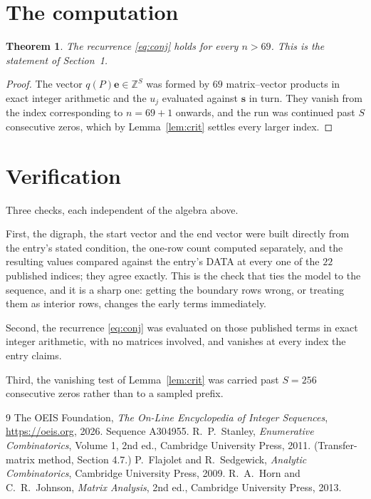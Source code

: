 \documentclass[11pt,a4paper]{article}
\theoremstyle{plain}
\newtheorem{theorem}{Theorem}
\theoremstyle{definition}
\begin{document}
\section{The computation}

\begin{theorem}
The recurrence \eqref{eq:conj} holds for every $n>69$. This is the statement of
Section~1.
\end{theorem}

\begin{proof}
The vector $q(P)\mathbf{e}\in\mathbb{Z}^{S}$ was formed by $69$ matrix--vector
products in exact integer arithmetic and the $u_j$ evaluated against $\mathbf{s}$ in turn.
They vanish from the index corresponding to $n=69+1$ onwards, and the run was continued
past $S$ consecutive zeros, which by Lemma~\ref{lem:crit} settles every larger index.
\end{proof}

\section{Verification}

Three checks, each independent of the algebra above.

First, the digraph, the start vector and the end vector were built directly from the
entry's stated condition, the one-row count computed separately, and the resulting values
compared against the entry's DATA at every one of the $22$ published indices; they
agree exactly. This is the check that ties the model to the sequence, and it is a sharp one:
getting the boundary rows wrong, or treating them as interior rows, changes the early terms
immediately.

Second, the recurrence \eqref{eq:conj} was evaluated on those published terms in exact
integer arithmetic, with no matrices involved, and vanishes at every index the entry claims.

Third, the vanishing test of Lemma~\ref{lem:crit} was carried past $S=256$ consecutive
zeros rather than to a sampled prefix.

\begin{thebibliography}{9}
 The OEIS Foundation, \emph{The On-Line Encyclopedia of Integer
Sequences}, \url{https://oeis.org}, 2026. Sequence A304955.
 R.~P.~Stanley, \emph{Enumerative Combinatorics}, Volume 1, 2nd ed.,
Cambridge University Press, 2011. (Transfer-matrix method, Section 4.7.)
 P.~Flajolet and R.~Sedgewick, \emph{Analytic Combinatorics}, Cambridge
University Press, 2009.
 R.~A.~Horn and C.~R.~Johnson, \emph{Matrix Analysis}, 2nd ed., Cambridge
University Press, 2013.
\end{thebibliography}
\end{document}
